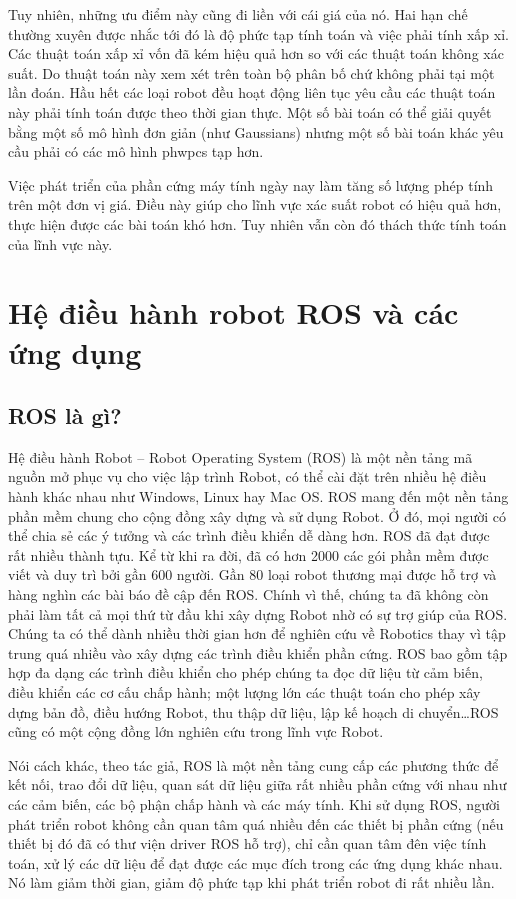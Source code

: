 {Tuy nhiên, những ưu điểm này cũng đi liền với cái giá của nó. Hai hạn chế thường xuyên được nhắc tới đó là độ phức tạp tính toán và việc phải tính xấp xỉ. Các thuật toán xấp xỉ vốn đã kém hiệu quả hơn so với các thuật toán không xác suất. Do thuật toán này xem xét trên toàn bộ phân bố chứ không phải tại một lần đoán. Hầu hết các loại robot đều hoạt động liên tục yêu cầu các thuật toán này phải tính toán được theo thời gian thực. Một số bài toán có thể giải quyết bằng một số mô hình đơn giản (như Gaussians) nhưng một số bài toán khác yêu cầu phải có các mô hình phwpcs tạp hơn.

Việc phát triển của phần cứng máy tính ngày nay làm tăng số lượng phép tính trên một đơn vị giá. Điều này giúp cho lĩnh vực xác suất robot có hiệu quả hơn, thực hiện được các bài toán khó hơn. Tuy nhiên vẫn còn đó thách thức tính toán của lĩnh vực này. \cite{thrun2005probabilistic}


\section{Hệ điều hành robot ROS và các ứng dụng}
\subsection{ROS là gì?}
Hệ điều hành Robot – Robot Operating System (ROS) là một nền tảng mã nguồn
mở phục vụ cho việc lập trình Robot, có thể cài đặt trên nhiều hệ điều hành khác
nhau như Windows, Linux hay Mac OS. ROS mang đến một nền tảng phần mềm
chung cho cộng đồng xây dựng và sử dụng Robot. Ở đó, mọi người có thể chia sẻ
các ý tưởng và các trình điều khiển dễ dàng hơn.
ROS đã đạt được rất nhiều thành tựu. Kể từ khi ra đời, đã có hơn 2000 các gói
phần mềm được viết và duy trì bởi gần 600 người. Gần 80 loại robot thương mại
được hỗ trợ và hàng nghìn các bài báo đề cập đến ROS. Chính vì thế, chúng ta đã
không còn phải làm tất cả mọi thứ từ đầu khi xây dựng Robot nhờ có sự trợ giúp
của ROS. Chúng ta có thể dành nhiều thời gian hơn để nghiên cứu về Robotics
thay vì tập trung quá nhiều vào xây dựng các trình điều khiển phần cứng.
ROS bao gồm tập hợp đa dạng các trình điều khiển cho phép chúng ta đọc dữ
liệu từ cảm biến, điều khiển các cơ cấu chấp hành; một lượng lớn các thuật toán
cho phép xây dựng bản đồ, điều hướng Robot, thu thập dữ liệu, lập kế hoạch di
chuyển\dots ROS cũng có một cộng đồng lớn nghiên cứu trong lĩnh vực Robot.

Nói cách khác, theo tác giả, ROS là một nền tảng cung cấp các phương thức để kết nối, trao đổi dữ liệu, quan sát dữ liệu giữa rất nhiều phần cứng với nhau như các cảm biến, các bộ phận chấp hành và các máy tính. Khi sử dụng ROS, người phát triển robot không cần quan tâm quá nhiều đến các thiết bị phần cứng (nếu thiết bị đó đã có thư viện driver ROS hỗ trợ), chỉ cần quan tâm đên việc tính toán, xử lý các dữ liệu để đạt được các mục đích trong các ứng dụng khác nhau. Nó làm giảm thời gian, giảm độ phức tạp khi phát triển robot đi rất nhiều lần.

}
